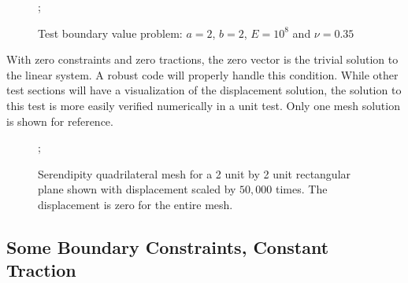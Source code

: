 \documentclass{article}
\begin{document}
\begin{figure}
    ;
    \caption{Test boundary value problem: $a = 2$, $b = 2$, $E = 10^8$ and $\nu = 0.35$}
\centering
\end{figure}

With zero constraints and zero tractions, the zero vector is the trivial solution to the linear system. A robust code will properly handle this condition. While other test sections will have a visualization of the displacement solution, the solution to this test is more easily verified numerically in a unit test. Only one mesh solution is shown for reference.

\begin{figure}
    ;
    \caption{Serendipity quadrilateral mesh for a 2 unit by 2 unit rectangular plane shown with displacement scaled by $50,000$ times. The displacement is zero for the entire mesh.}
\centering
\end{figure}

\FloatBarrier
\subsection{Some Boundary Constraints, Constant Traction}
\label{subsec:simple_traction}
\FloatBarrier
\end{document}
